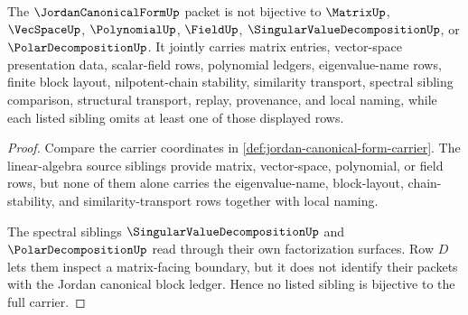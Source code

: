 \begin{theorem}
\label{thm:jordan-canonical-form-sibling-noncollapse}
The $\JordanCanonicalFormUp$ packet is not bijective to $\MatrixUp$, $\VecSpaceUp$, $\PolynomialUp$, $\FieldUp$, $\SingularValueDecompositionUp$, or $\PolarDecompositionUp$. It jointly carries matrix entries, vector-space presentation data, scalar-field rows, polynomial ledgers, eigenvalue-name rows, finite block layout, nilpotent-chain stability, similarity transport, spectral sibling comparison, structural transport, replay, provenance, and local naming, while each listed sibling omits at least one of those displayed rows.
\end{theorem}
\begin{proof}
Compare the carrier coordinates in \autoref{def:jordan-canonical-form-carrier}. The linear-algebra source siblings provide matrix, vector-space, polynomial, or field rows, but none of them alone carries the eigenvalue-name, block-layout, chain-stability, and similarity-transport rows together with local naming.

The spectral siblings $\SingularValueDecompositionUp$ and $\PolarDecompositionUp$ read through their own factorization surfaces. Row $D$ lets them inspect a matrix-facing boundary, but it does not identify their packets with the Jordan canonical block ledger. Hence no listed sibling is bijective to the full carrier.
\end{proof}




